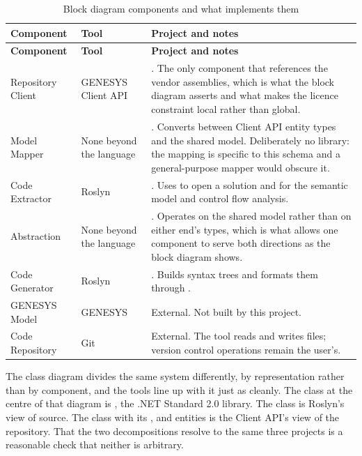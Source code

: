 \begin{longtable}{L{0.21\textwidth}L{0.24\textwidth}L{0.45\textwidth}}
	\caption{Block diagram components and what implements them}\label{tab:components}\\
	\toprule
	\textbf{Component} & \textbf{Tool} & \textbf{Project and notes} \\
	\midrule
	\endfirsthead
	\toprule
	\textbf{Component} & \textbf{Tool} & \textbf{Project and notes} \\
	\midrule
	\endhead

	Repository Client & GENESYS Client API & . The only
	component that references the vendor assemblies, which is what the block
	diagram asserts and what makes the licence constraint local rather than
	global. \\
	\addlinespace

	Model Mapper & None beyond the language & . Converts
	between Client API entity types and the shared model. Deliberately no library:
	the mapping is specific to this schema and a general-purpose mapper would
	obscure it. \\
	\addlinespace

	Code Extractor & Roslyn & . Uses
	 to open a solution and
	 for the semantic model and control flow
	analysis. \\
	\addlinespace

	Abstraction & None beyond the language & .
	Operates on the shared model rather than on either end's types, which is what
	allows one component to serve both directions as the block diagram shows. \\
	\addlinespace

	Code Generator & Roslyn & . Builds syntax trees
	and formats them through
	. \\
	\addlinespace

	GENESYS Model & GENESYS & External. Not built by this project. \\
	\addlinespace

	Code Repository & Git & External. The tool reads and writes files; version
	control operations remain the user's. \\
	\bottomrule
\end{longtable}

The class diagram divides the same system differently, by representation rather
than by component, and the tools line up with it just as cleanly. The
 class at the centre of that diagram is , the
.NET Standard 2.0 library. The  class is Roslyn's view of source. The
 class with its ,  and
 entities is the Client API's view of the repository. That the two
decompositions resolve to the same three projects is a reasonable check that
neither is arbitrary.

